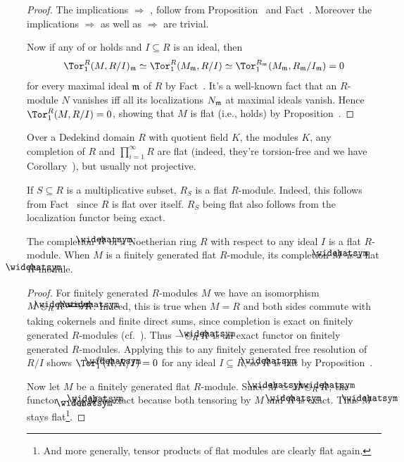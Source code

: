\documentclass[a4paper,parskip=half,numbers=enddot, DIV=12]{scrreprt}
\begin{document}
\begin{proof}
	The implications  $\Rightarrow$ ,  follow from Proposition~ and Fact~. Moreover the implications  $\Rightarrow$  as well as  $\Rightarrow$  are trivial.
	
	Now if any of  or  holds and $I\subseteq R$ is an ideal, then
	\begin{align*}
		\Tor_1^R(M,R/I)_\mm\simeq \Tor_1^R(M_\mm,R/I)\simeq \Tor_1^{R_\mm}(M_\mm,R_\mm/I_\mm)=0
	\end{align*}
	for every maximal ideal $\mathfrak{m}$ of $R$ by Fact~. It's a well-known fact that an $R$-module $N$ vanishes iff all its localizations $N_{\mathfrak{m}}$ at maximal ideals vanish. Hence $\Tor_1^R(M,R/I)=0$, showing that $M$ is flat (i.e.,  holds) by Proposition~.
\end{proof}
\begin{example}
	Over a Dedekind domain $R$ with quotient field $K$, the modules $K$, any completion of $R$ and $\prod_{i=1}^{\infty}R$ are flat (indeed, they're torsion-free and we have Corollary~), but usually not projective.
\end{example}
\begin{example}
	If $S\subseteq R$ is a multiplicative subset, $R_S$ is a flat $R$-module. Indeed, this follows from Fact~ since $R$ is flat over itself. $R_S$ being flat also follows from the localization functor being exact.
\end{example}
\begin{example}
	The completion $\roof{R}$ of a Noetherian ring $R$ with respect to any ideal $I$ is a flat $R$-module. When $M$ is a finitely generated flat $R$-module, its completion $\roof{M}$ is a flat $\roof{R}$-module.
\end{example}
\begin{proof}
	For finitely generated $R$-modules $M$ we have an isomorphism $M\otimes_R\roof{R}\isomorphism \roof{R}$. Indeed, this is true when $M=R$ and both sides commute with taking cokernels and finite direct sums, since completion is exact on finitely generated $R$-modules (cf.\ \cite[Lemma~7.15]{eisenbudCommAlg}). Thus $-\otimes_R\roof{R}$ is an exact functor on finitely generated $R$-modules. Applying this to any finitely generated free resolution of $R/I$ shows $\Tor_1^R(\roof{R},R/I)=0$ for any ideal $I\subseteq R$, so $\roof{R}$ is flat by Proposition~.
	
	Now let $M$ be a finitely generated flat $R$-module. Since $\roof{M}\simeq M\otimes_R\roof{R}$, the functor $-\otimes_{\roof{R}}\roof{M}$ is exact because both tensoring by $M$ and $\roof{R}$ is exact. Thus $\roof{M}$ stays flat\footnote{And more generally, tensor products of flat modules are clearly flat again.}.
\end{proof}
\end{document}
